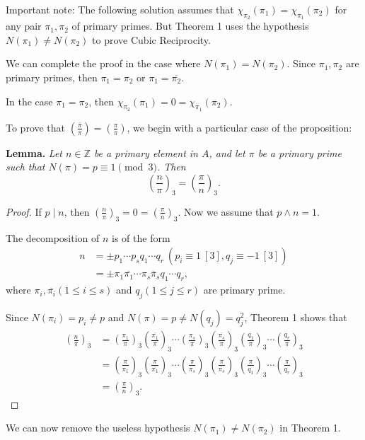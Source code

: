 \documentclass[11pt,a4paper]{article}
\newcommand{\Z}{\mathbb{Z}}
\newcommand{\legendre}[2]{\genfrac{(}{)}{}{}{#1}{#2}}
\begin{document}
\bigskip


Important note: The following solution assumes that $\chi_{\pi_2}(\pi_1) = \chi_{\pi_1}(\pi_2)$ for any pair $\pi_1,\pi_2$ of primary primes. But Theorem 1 uses the hypothesis $N(\pi_1) \ne N(\pi_2)$ to prove Cubic Reciprocity.

We can complete the proof in the case where $N(\pi_1) = N(\pi_2)$. Since $\pi_1,\pi_2$ are primary primes, then $\pi_1 = \pi_2$ or $\pi_1 = \overline{\pi_2}$.

In the case $\pi_1 = \pi_2$, then $\chi_{\pi_2}(\pi_1) = 0 =  \chi_{\pi_1}(\pi_2)$.

To prove that $\legendre{\overline{\pi}}{\pi} = \legendre{\pi}{\overline{\pi}}$, we begin with a particular case of the proposition:

\medskip
{\bf Lemma.} {\it Let $n\in \Z$ be a primary element in $A$, and let $\pi$ be a primary prime such that $N(\pi) = p \equiv 1 \pmod 3$. Then
$$\legendre{n}{\pi}_3 = \legendre{\pi}{n}_3.$$
}



\begin{proof}
If $p \mid n$, then $\legendre{n}{\pi}_3 =0 =  \legendre{\pi}{n}_3.$ Now we assume that $p \wedge n = 1$.

The decomposition of $n$ is of the form
\begin{align*} n &= \pm p_1 \cdots p_s q_1 \cdots q_r\ (p_i \equiv 1 \ [3], q_j \equiv -1 \ [3])\\
&= \pm \pi_1\overline{\pi_1} \cdots \pi_s \overline{\pi}_s q_1 \cdots q_r,
\end{align*}
where $\pi_i, \overline{\pi_i} (1\leq i \leq s)$ and $q_j (1 \leq j \leq r)$ are primary prime.

Since $N(\pi_i) = p_i \ne p$ and $N(\pi) = p \ne N(q_j) =q_j^2$, Theorem 1 shows that
\begin{align*}
\legendre{n}{\pi}_3 &=\legendre{\pi_1}{\pi}_3\legendre{\overline{\pi_1}}{\pi}_3\cdots \legendre{\pi_s}{\pi}_3\legendre{\overline{\pi_s}}{\pi}_3 \legendre{q_1}{\pi}_3  \cdots \legendre{q_r}{\pi}_3 \\
&=\legendre{\pi}{\pi_1}_3\legendre{\pi}{\overline{\pi_1}}_3\cdots \legendre{\pi}{\pi_s}_3\legendre{\pi}{\overline{\pi_s}}_3 \legendre{\pi}{q_1}_3  \cdots \legendre{\pi}{q_r}_3 \\
&= \legendre{\pi}{n}_3.
\end{align*}
\end{proof}

We can now remove the useless hypothesis $N(\pi_1) \ne N(\pi_2)$ in Theorem 1.
\end{document}
